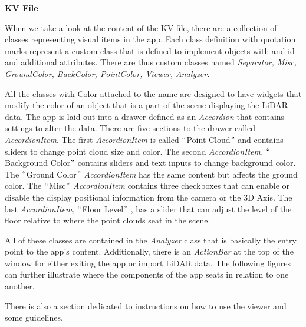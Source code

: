 \documentclass[12pt]{report}
\begin{document}
\vspace{\baselineskip}
\textbf{KV File}\par

\tab 
\vspace{\baselineskip}When we take a look at the content of the KV file, there are a collection of classes representing visual items in the app. Each class definition with quotation marks represent a custom class that is defined to implement objects with and id and additional attributes. There are thus custom classes named \textit{Separator, Misc, GroundColor, BackColor, PointColor, Viewer, Analyzer.}\par


\vspace{\baselineskip}
\tab All the classes with Color attached to the name are designed to have widgets that modify the color of an object that is a part of the scene displaying the LiDAR data. The app is laid out into a drawer defined as an \textit{Accordion} that contains settings to alter the data. There are five sections to the drawer called \textit{AccordionItem}. The first \textit{AccordionItem }is called $``$Point Cloud$"$  and contains sliders to change point cloud size and color. The second \textit{AccordionItem, }$``$Background Color$"$ \textit{ }contains sliders and text inputs to change background color. The $``$Ground Color$"$  \textit{AccordionItem} has the same content but affects the ground color. The $``$Misc$"$  \textit{AccordionItem }contains three checkboxes that can enable or disable the display positional information from the camera or the 3D Axis. The last \textit{AccordionItem, }$``$Floor Level$"$ , has a slider that can adjust the level of the floor relative to where the point clouds seat in the scene.\par


\vspace{\baselineskip}
All of these classes are contained in the \textit{Analyzer }class that is basically the entry point to the app’s content. Additionally, there is an \textit{ActionBar }at the top of the window for either exiting the app or import LiDAR data. The following figures can further illustrate where the components of the app seats in relation to one another.\par


\vspace{\baselineskip}
There is also a section dedicated to instructions on how to use the viewer and some guidelines.\par
\end{document}

